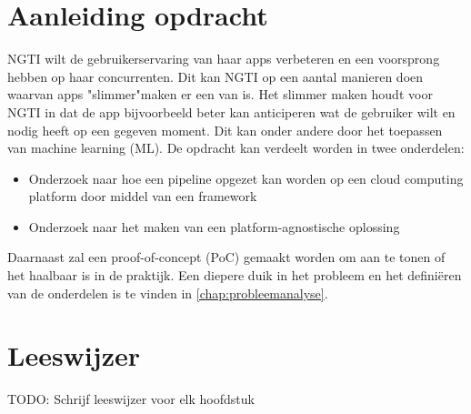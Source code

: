 \section{Aanleiding opdracht}\label{sec:aanleiding-opdracht}
NGTI wilt de gebruikerservaring van haar apps verbeteren en een voorsprong hebben op haar concurrenten. Dit kan NGTI op een aantal manieren doen waarvan apps "slimmer"\space maken er een van is. Het slimmer maken houdt voor NGTI in dat de app bijvoorbeeld beter kan anticiperen wat de gebruiker wilt en nodig heeft op een gegeven moment. Dit kan onder andere door het toepassen van machine learning (ML). De opdracht kan verdeelt worden in twee onderdelen:

\begin{itemize}
  \item Onderzoek naar hoe een pipeline opgezet kan worden op een cloud computing platform door middel van een framework
  \item Onderzoek naar het maken van een platform-agnostische oplossing
\end{itemize}

Daarnaast zal een proof-of-concept (PoC) gemaakt worden om aan te tonen of het haalbaar is in de praktijk. Een diepere duik in het probleem en het definiëren van de onderdelen is te vinden in \autoref{chap:probleemanalyse}.

\section{Leeswijzer}\label{sec:leeswijzer}
TODO: Schrijf leeswijzer voor elk hoofdstuk